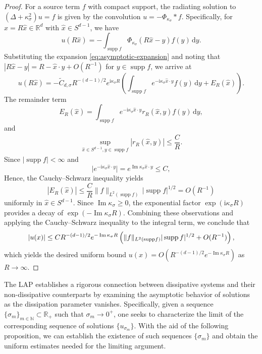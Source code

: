 \documentclass[12pt,reqno]{amsart}
\numberwithin{equation}{section}
\begin{document}
\begin{proof}
For a source term $f$ with compact support, the radiating solution to $(\Delta + \kappa_\sigma^2)u = f$ is given by the convolution $u = -\Phi_{\kappa_\sigma} * f$. Specifically, for $x = R\hat{x} \in \mathbb{R}^d$ with $\hat{x} \in S^{d-1}$, we have
\begin{equation}
u(R\hat{x}) = -\int_{\operatorname{supp} f} \Phi_{\kappa_\sigma}(R\hat{x} - y) f(y) \,\mathrm{d}y.
\end{equation}
Substituting the expansion \eqref{eq:asymptotic-expansion} and noting that $|R\hat{x} - y| = R - \hat{x} \cdot y + O(R^{-1})$ for $y \in \operatorname{supp} f$, we arrive at
\begin{equation*}
u(R\hat{x}) = -\widetilde{C}_{d,\sigma} R^{-(d-1)/2} e^{\mathrm{i}\kappa_\sigma R} \left( \int_{\operatorname{supp} f} e^{-\mathrm{i}\kappa_\sigma \hat{x} \cdot y} f(y) \,\mathrm{d}y + E_R(\hat{x}) \right).
\end{equation*}
The remainder term
\[
E_R(\hat{x}) = \int_{\operatorname{supp} f} e^{-\mathrm{i}\kappa_\sigma\hat{x}\cdot y}r_R(\hat{x}, y) f(y)\,\mathrm{d}y,
\]
and
\begin{align*}
\sup\limits_{\hat{x}\in S^{d-1},y\in\operatorname{supp}f}|r_R(\hat{x}, y)|\leq\dfrac{C}{R}.
\end{align*}
Since $|\operatorname{supp} f| < \infty$ and
\[
\bigl|e^{-\mathrm{i}\kappa_\sigma\hat{x}\cdot y}\bigr| = e^{\operatorname{Im}\kappa_\sigma \hat{x}\cdot y} \leq C,
\]
Hence, the Cauchy--Schwarz inequality yields
\[
|E_R(\hat{x})| \leq \frac{C}{R} \|f\|_{L^2(\operatorname{supp} f)}\, |\operatorname{supp} f|^{1/2} = O(R^{-1})
\]
uniformly in $\hat{x}\in S^{d-1}$.
 Since $\operatorname{Im} \kappa_\sigma \ge 0$, the exponential factor $\exp(\mathrm{i}\kappa_\sigma R)$ provides a decay of $\exp(-\operatorname{Im} \kappa_\sigma R)$. Combining these observations and applying the Cauchy--Schwarz inequality to the integral term, we conclude that
\begin{equation*}
|u(x)| \le C R^{-(d-1)/2} e^{-\operatorname{Im} \kappa_\sigma R} \left( \|f\|_{L^2({\rm supp}f)} |\operatorname{supp} f|^{1/2} + O(R^{-1}) \right),
\end{equation*}
which yields the desired uniform bound $u(x) = O(R^{-(d-1)/2} e^{-\operatorname{Im} \kappa_\sigma R})$ as $R \to \infty$.
\end{proof}


The LAP establishes a rigorous connection between dissipative systems and their non-dissipative counterparts by examining the asymptotic behavior of solutions as the dissipation parameter vanishes. Specifically, given a sequence $\{\sigma_m\}_{m \in \mathbb{N}} \subset \mathbb{R}_+$ such that $\sigma_m \to 0^+$, one seeks to characterize the limit of the corresponding sequence of solutions $\{u_{\sigma_m}\}$. With the aid of the following proposition, we can establish the existence of such sequences $\{\sigma_m\}$ and obtain the uniform estimates needed for the limiting argument.
\end{document}
